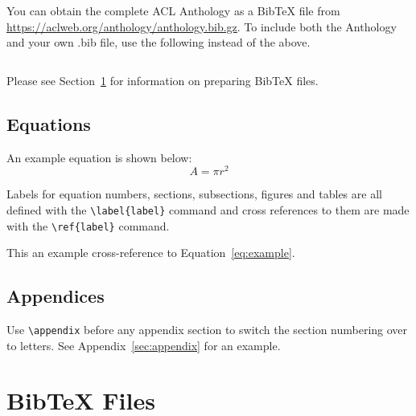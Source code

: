 \documentclass[11pt]{article}
\begin{document}
You can obtain the complete ACL Anthology as a Bib\TeX{} file from \url{https://aclweb.org/anthology/anthology.bib.gz}.
To include both the Anthology and your own .bib file, use the following instead of the above.
\begin{quote}
\begin{verbatim}

\end{verbatim}
\end{quote}

Please see Section~\ref{sec:bibtex} for information on preparing Bib\TeX{} files.

\subsection{Equations}

An example equation is shown below:
\begin{equation}
  \label{eq:example}
  A = \pi r^2
\end{equation}

Labels for equation numbers, sections, subsections, figures and tables
are all defined with the \verb|\label{label}| command and cross references
to them are made with the \verb|\ref{label}| command.

This an example cross-reference to Equation~\ref{eq:example}.

\subsection{Appendices}

Use \verb|\appendix| before any appendix section to switch the section numbering over to letters. See Appendix~\ref{sec:appendix} for an example.

\section{Bib\TeX{} Files}
\label{sec:bibtex}
\end{document}
